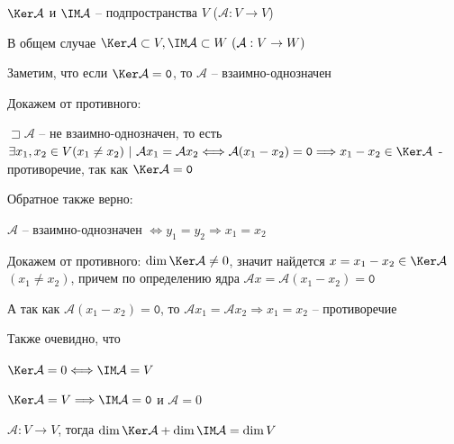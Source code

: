 \documentclass[12pt]{article}
\begin{document}
    \Notas $\Ker \mathcal{A}$ и $\IM \mathcal{A}$ -- подпространства $V$ ($\mathcal{A} : V \rightarrow V$)

    В общем случае $\Ker \mathcal{A} \subset V, \IM \mathcal{A} \subset W \ (\mathcal{A} : V \rightarrow W)$

    \mediumvspace

    Заметим, что если $\Ker \mathcal{A} = \texttt{0}$, то $\mathcal{A}$ -- взаимно-однозначен

    \begin{MyProof}
        Докажем от противного:

        $\sqsupset \mathcal{A}$ -- не взаимно-однозначен, то есть 
        $\exists x_1, x_2 \in V (x_1 \neq x_2) \ | \ \mathcal{A}x_1 = \mathcal{A}x_2 \Longleftrightarrow 
        \mathcal{A} (x_1 - x_2) = \texttt{0} \Longrightarrow x_1 - x_2 \in \Ker \mathcal{A}$ - 
        противоречие, так как $\Ker \mathcal{A} = \texttt{0}$
    \end{MyProof}

    \Notas Обратное также верно:

    \begin{MyProof}
        $\mathcal{A}$ -- взаимно-однозначен $\Longleftrightarrow y_1 = y_2 \Longrightarrow x_1 = x_2$

        Докажем от противного: $\dim \Ker \mathcal{A} \neq 0$, значит найдется $x = x_1 - x_2 \in \Ker \mathcal{A}$ $(x_1 \neq x_2)$, 
        причем по определению ядра $\mathcal{A} x = \mathcal{A} (x_1 - x_2) = \texttt{0}$

        А так как $\mathcal{A} (x_1 - x_2) = \texttt{0}$, то $\mathcal{A} x_1 = \mathcal{A} x_2 \Longrightarrow x_1 = x_2$ -- противоречие
    \end{MyProof}

    \Nota Также очевидно, что

    $\Ker \mathcal{A} = 0 \Longleftrightarrow \IM \mathcal{A} = V$

    $\Ker \mathcal{A} = V \Longrightarrow \IM \mathcal{A} = \texttt{0}$ и $\mathcal{A} = 0$

    \hypertarget{theoremaboutdimensions}{}

    \begin{MyTheorem}
        \Ths $\mathcal{A} : V \rightarrow V$, тогда $\dim \Ker \mathcal{A} + \dim \IM \mathcal{A} = \dim V$
    \end{MyTheorem}
\end{document}
